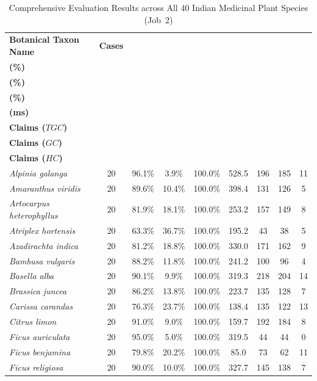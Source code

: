 \begin{table}[htbp]
\centering
\scriptsize
\setlength{\tabcolsep}{2.5pt}
\caption{Comprehensive Evaluation Results across All 40 Indian Medicinal Plant Species (Job~2)}
\label{tab:per_plant_breakdown}
\begin{tabular}{@{}l c c c c c c c c@{}}
\hline
\textbf{Botanical Taxon Name} & \textbf{Cases} & \shortstack{\textbf{Grounded}\\\textbf{(\%)}} & \shortstack{\textbf{Halluc.}\\\textbf{(\%)}} & \shortstack{\textbf{Tool Acc.}\\\textbf{(\%)}} & \shortstack{\textbf{Latency}\\\textbf{(ms)}} & \shortstack{\textbf{Total}\\\textbf{Claims ($TGC$)}} & \shortstack{\textbf{Grounded}\\\textbf{Claims ($GC$)}} & \shortstack{\textbf{Halluc.}\\\textbf{Claims ($HC$)}} \\
\hline
\textit{Alpinia galanga} & 20 & 96.1\% & 3.9\% & 100.0\% & 528.5 & 196 & 185 & 11 \\
\textit{Amaranthus viridis} & 20 & 89.6\% & 10.4\% & 100.0\% & 398.4 & 131 & 126 & 5 \\
\textit{Artocarpus heterophyllus} & 20 & 81.9\% & 18.1\% & 100.0\% & 253.2 & 157 & 149 & 8 \\
\textit{Atriplex hortensis} & 20 & 63.3\% & 36.7\% & 100.0\% & 195.2 & 43 & 38 & 5 \\
\textit{Azadirachta indica} & 20 & 81.2\% & 18.8\% & 100.0\% & 330.0 & 171 & 162 & 9 \\
\textit{Bambusa vulgaris} & 20 & 88.2\% & 11.8\% & 100.0\% & 241.2 & 100 & 96 & 4 \\
\textit{Basella alba} & 20 & 90.1\% & 9.9\% & 100.0\% & 319.3 & 218 & 204 & 14 \\
\textit{Brassica juncea} & 20 & 86.2\% & 13.8\% & 100.0\% & 223.7 & 135 & 128 & 7 \\
\textit{Carissa carandas} & 20 & 76.3\% & 23.7\% & 100.0\% & 138.4 & 135 & 122 & 13 \\
\textit{Citrus limon} & 20 & 91.0\% & 9.0\% & 100.0\% & 159.7 & 192 & 184 & 8 \\
\textit{Ficus auriculata} & 20 & 95.0\% & 5.0\% & 100.0\% & 319.5 & 44 & 44 & 0 \\
\textit{Ficus benjamina} & 20 & 79.8\% & 20.2\% & 100.0\% & 85.0 & 73 & 62 & 11 \\
\textit{Ficus religiosa} & 20 & 90.0\% & 10.0\% & 100.0\% & 327.7 & 145 & 138 & 7 \\

\end{tabular}
\end{table}
